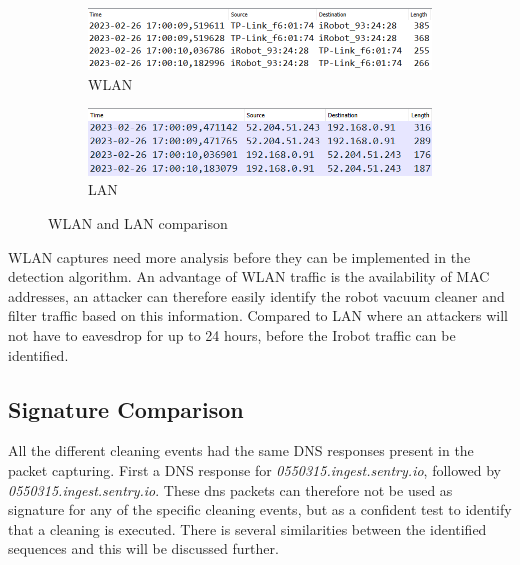 \begin{figure}[H]
    \centering
    \begin{subfigure}[b]{0.9\textwidth}
        \includegraphics[width=\textwidth]{figures/WLANLANComparison.png}
        \caption{WLAN}
    \end{subfigure}
    \quad
    \begin{subfigure}[b]{0.9\textwidth}
        \includegraphics[width=\textwidth]{figures/LANWLANcomparison.png}
        \caption{LAN}
    \end{subfigure}
    
    \caption{WLAN and LAN comparison}
    \label{fig:WLANLANHeader}
\end{figure}

WLAN captures need more analysis before they can be implemented in the detection algorithm. An advantage of WLAN traffic is the availability of MAC addresses, an attacker can therefore easily identify the robot vacuum cleaner and filter traffic based on this information. Compared to LAN where an attackers will not have to eavesdrop for up to 24 hours, before the Irobot traffic can be identified. 
 

\subsection{Signature Comparison}
All the different cleaning events had the same DNS responses present in the packet capturing. First a DNS response for \textit{0550315.ingest.sentry.io}, followed by \textit{0550315.ingest.sentry.io}. These dns packets can therefore not be used as signature for any of the specific cleaning events, but as a confident test to identify that a cleaning is executed. There is several similarities between the identified sequences and this will be discussed further.

